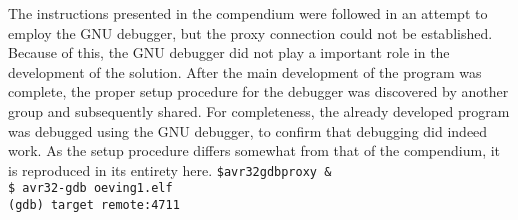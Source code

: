 The instructions presented in the compendium were followed in an attempt to employ the GNU debugger, but the proxy connection could not be established.
Because of this, the GNU debugger did not play a important role in the development of the solution.
After the main development of the program was complete, the proper setup procedure for the debugger was discovered by another group and subsequently shared.
For completeness, the already developed program was debugged using the GNU debugger, to confirm that debugging did indeed work.
As the setup procedure differs somewhat from that of the compendium, it is reproduced in its entirety here.
\texttt{\$avr32gdbproxy \&\\
\$ avr32-gdb oeving1.elf \\
(gdb) target remote:4711}
